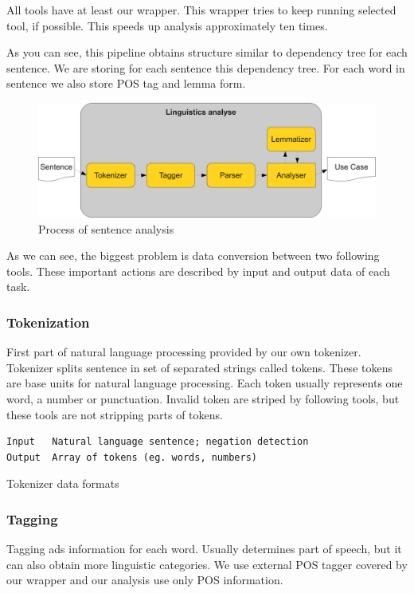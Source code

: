 All tools have at least our wrapper. This wrapper tries to keep running selected tool, if possible. This speeds up analysis approximately ten times.

As you can see, this pipeline obtains structure similar to dependency tree for each sentence. We are storing for each sentence this dependency tree. For each word in sentence we also store POS tag and lemma form.

\begin{figure}[ht]
  \centering
  \includegraphics[width=400pt]{images/LinguisticsAnalyse}
  \caption{Process of sentence analysis}
  \label{fig:LinguisticsAnalyse}
\end{figure}

As we can see, the biggest problem is data conversion between two following tools. These important actions are described by input and output data of each task.

\subsubsection{Tokenization}
First part of natural language processing provided by our own tokenizer. Tokenizer splits sentence in set of separated strings called tokens. These tokens are base units for natural language processing. Each token usually represents one word, a number or punctuation. Invalid token are striped by following tools, but these tools are not stripping parts of tokens.

\begin{table}[ht]   %
\begin{center}
    \begin{verbatim}
Input 	Natural language sentence; negation detection
Output 	Array of tokens (eg. words, numbers) 
        \end{verbatim}
  \caption{Tokenizer data formats}
  \label{tab.tokenization}
\end{center}
\end{table} 

\subsubsection{Tagging}
Tagging ads information for each word. Usually determines part of speech, but it can also obtain more linguistic categories. We use external POS tagger covered by our wrapper and our analysis use only POS information.

